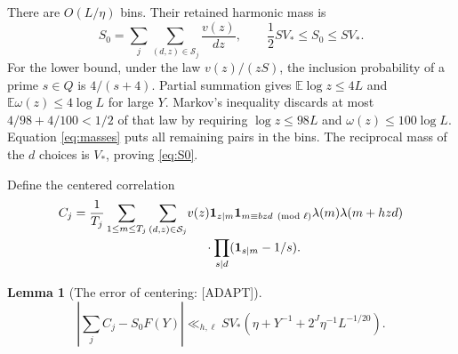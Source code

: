 \documentclass[11pt,a4paper]{article}
\numberwithin{equation}{section}
\newtheorem{lemma}[theorem]{Lemma}
\theoremstyle{remark}\newtheorem{remark}[theorem]{Remark}
\newcommand{\1}{\mathbf 1}
\newcommand{\E}{\mathbb E}
\begin{document}
There are $O(L/\eta)$ bins. Their retained harmonic mass is
\begin{equation}\label{eq:S0}
 S_0=\sum_j\sum_{(d,z)\in\mathcal S_j}\frac{v(z)}{dz},\qquad
 \frac12SV_*\le S_0\le SV_*.
\end{equation}
For the lower bound, under the law $v(z)/(zS)$, the inclusion probability
of a prime $s\in Q$ is $4/(s+4)$. Partial summation gives
$\E\log z\le4L$ and $\E\omega(z)\le4\log L$ for large $Y$.
Markov's inequality discards at most $4/98+4/100<1/2$ of that law by
requiring $\log z\le98L$ and $\omega(z)\le100\log L$. Equation
\eqref{eq:masses} puts all remaining pairs in the bins. The reciprocal
mass of the $d$ choices is $V_*$, proving \eqref{eq:S0}.

Define the centered correlation
\begin{equation}\label{eq:Cj}
 \begin{split}
 C_j=\frac1{T_j}\sum_{1\le m\le T_j}\sum_{(d,z)\in\mathcal S_j}
 &v(z)\1_{z\mid m}\1_{m\equiv bzd\pmod\ell}
 \lambda(m)\lambda(m+hzd)\\[-2pt]
 &\hspace{5mm}\cdot\prod_{s\mid d}(\1_{s\mid m}-1/s).
 \end{split}
\end{equation}
\begin{lemma}[The error of centering: {\rm[ADAPT]}]
\label{lem:center}
\begin{equation}\label{eq:center}
 \left|\sum_j C_j-S_0F(Y)\right|
 \ll_{h,\ell}SV_*\left(\eta+Y^{-1}
                           +2^J\eta^{-1}L^{-1/20}\right).
\end{equation}
\end{lemma}
\end{document}
